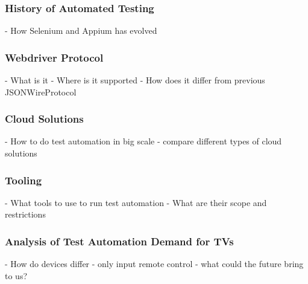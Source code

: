 \subsubsection{History of Automated Testing\label{sec:history}}

- How Selenium and Appium has evolved

\subsubsection{Webdriver Protocol\label{sec:webdriver}}

- What is it
- Where is it supported
- How does it differ from previous JSONWireProtocol

\subsubsection{Cloud Solutions\label{sec:cloud}}

- How to do test automation in big scale
- compare different types of cloud solutions

\subsubsection{Tooling\label{sec:tooling}}

- What tools to use to run test automation
- What are their scope and restrictions

\subsubsection{Analysis of Test Automation Demand for TVs\label{sec:testautomationontv}}

- How do devices differ
- only input remote control
- what could the future bring to us?
